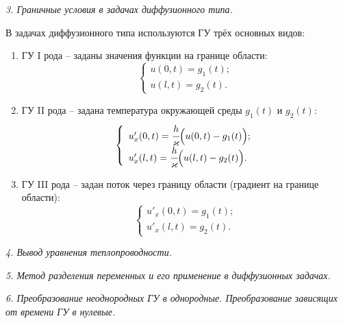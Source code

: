 \newpage %

\emph{3. Граничные условия в задачах диффузионного типа.}

В задачах диффузионного типа используются ГУ трёх основных видов:
\begin{enumerate}
    \item ГУ I рода -- заданы значения функции на границе области:
    \[
        \left\{ \begin{array}{l}
            u(0, t) = g_1(t); \\
            u(l, t) = g_2(t).
        \end{array} \right.
    \]
    
    \item ГУ II рода -- задана температура окружающей среды \( g_1(t) \) и
    \( g_2(t) \):
    \[
        \left\{ \begin{array}{l}
            u'_x(0, t) = \cfrac{h}{\kappa}\Big(u(0, t) - g_1(t)\Big); \\
            u'_x(l, t) = \cfrac{h}{\kappa}\Big(u(l, t) - g_2(t)\Big).
        \end{array} \right.
    \]
    
    \item ГУ III рода -- задан поток через границу области (градиент на границе
    области):
    \[
        \left\{ \begin{array}{l}
            u'_x(0, t) = g_1(t); \\
            u'_x(l, t) = g_2(t).
        \end{array} \right.
    \]
\end{enumerate}

\newpage %

\emph{4. Вывод уравнения теплопроводности.}

\newpage %

\emph{5. Метод разделения переменных и его применение в диффузионных задачах.}

\newpage %

\emph{6. Преобразование неоднородных ГУ в однородные. Преобразование зависящих
от времени ГУ в нулевые.}

\newpage %

